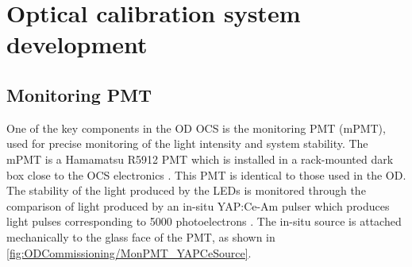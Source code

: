 \section{Optical calibration system development}\label{sec:ODCommissioning/OCSDevelopment}
\subsection{Monitoring PMT}\label{sec:ODCommissioning/MonitoringPMT}
One of the key components in the OD OCS is the monitoring PMT (mPMT), used for precise monitoring of the light intensity and system stability. The mPMT is a Hamamatsu R5912 PMT which is installed in a rack-mounted dark box close to the OCS electronics \cite{Turner:2021qvi}. This PMT is identical to those used in the OD. The stability of the light produced by the LEDs is monitored through the comparison of light produced by an in-situ YAP:Ce-Am pulser which produces light pulses corresponding to 5000 photoelectrons \cite{KOBAYASHI1994355}. The in-situ source is attached mechanically to the glass face of the PMT, as shown in \autoref{fig:ODCommissioning/MonPMT_YAPCeSource}.

